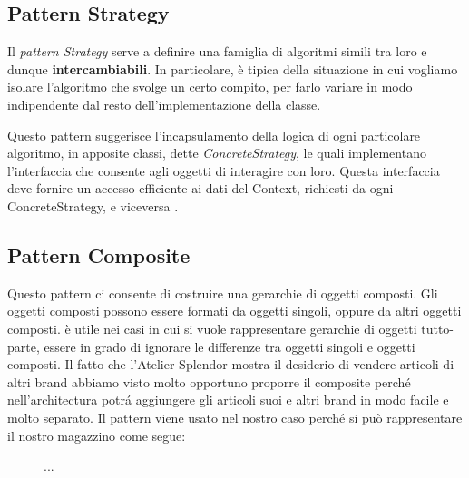 \documentclass[12pt]{article}
\begin{document}
\subsection{Pattern Strategy}

Il {\em pattern Strategy} serve a definire una famiglia di algoritmi simili tra loro e dunque \textbf{intercambiabili}. In particolare, è tipica della situazione in cui vogliamo isolare l’algoritmo che svolge un certo compito, per farlo variare in modo indipendente dal resto dell’implementazione della classe.

Questo pattern suggerisce l’incapsulamento della logica di ogni
particolare algoritmo, in apposite classi, dette {\em ConcreteStrategy}, le quali implementano l’interfaccia che consente agli oggetti di interagire con loro. Questa interfaccia deve fornire un accesso efficiente ai dati del Context, richiesti da ogni ConcreteStrategy, e viceversa \cite{gof_sunt}.



\subsection{Pattern Composite}
Questo pattern ci consente di costruire una gerarchie di oggetti composti. Gli oggetti composti possono essere formati da oggetti singoli, oppure da altri oggetti composti. è utile nei casi in cui si vuole rappresentare gerarchie di oggetti tutto-parte, essere in grado di ignorare le differenze tra oggetti singoli e oggetti composti. Il fatto che l'Atelier Splendor mostra il desiderio di vendere articoli di altri brand abbiamo visto molto opportuno proporre il composite perch\'e nell'architectura potr\'a aggiungere gli articoli suoi e altri brand in modo facile e molto separato.
Il pattern viene usato nel nostro caso perché si può rappresentare il nostro magazzino come segue:

\begin{figure}[!h]
    \centering
  \caption{\small ...}
  \label{fig:diagram_composite}
\end{figure}
\end{document}
